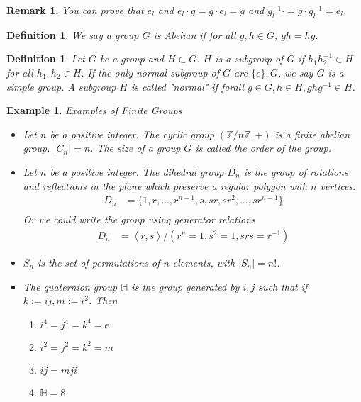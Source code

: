 \documentclass[letterpaper, leqno, 12pt]{article}
\newcommand{\fin}{\qquad \quad \hfill \framebox[1.75mm][l]{\,}}
\newcommand{\bZ}{\mathbb{Z}}
\providecommand{\abs}[1]{\left\lvert#1\right\rvert}
\providecommand{\ip}[1]{\left\langle #1 \right\rangle}
\theoremstyle{stdthm}
\theoremstyle{stddef}
\newtheorem{defn}[thm]{Definition}
\newtheorem{rem}[thm]{Remark} %
\newtheorem{eg}[thm]{Example} %
\theoremstyle{stdnonum}
\theoremstyle{stdqands}
\theoremstyle{stdbold}
\begin{document}
\begin{rem}
You can prove that $e_l$ and $e_l \cdot g = g \cdot e_l = g$ and $g_l^{-1} \cdot = g \cdot g_l^{-1} = e_l$. 
\end{rem}

\begin{defn}
We say a group $G$ is Abelian if for all $g,h\in G$, $gh = hg$. 
\end{defn}

\begin{defn}
Let $G$ be a group and $H\subset G$. $H$ is a subgroup of $G$ if $h_1 h_2^{-1} \in H$ for all $h_1,h_2 \in H$. If the only normal subgroup of $G$ are $\{e\},G$, we say $G$ is a simple group. A subgroup $H$ is called "normal" if forall $g\in G, h\in H, ghg^{-1} \in H$.   
\end{defn}

\begin{eg} Examples of Finite Groups
\begin{itemize}
\item Let $n$ be a positive integer. The cyclic group $(\bZ/n\bZ, +)$  is a finite abelian group. $|C_n| = n$. The size of a group $G$ is called the order of the group. 
\item Let $n$ be a positive integer. The dihedral group $D_n$ is the group of rotations and reflections in the plane which preserve a regular polygon with $n$ vertices. 
\begin{align*}
D_n &= \{1,r,\dots,r^{n-1}, s,sr,sr^2,\dots,sr^{n-1}\}\\
\end{align*}
Or we could write the group using generator relations
\begin{align*}
D_n &= \ip{r,s}/(r^n=1,s^2 =1, srs = r^{-1})
\end{align*}

\item $S_n$ is the set of permutations of $n$ elements, with $\abs{S_n} = n!$. 

\item The quaternion group $\mathbb{H}$ is the group generated by $i,j$ such that if $k:= ij, m:= i^2$. Then
\begin{enumerate}
\item $i^4 = j^4 = k^4 = e$
\item $i^2 = j^2 = k^2 = m$
\item $ij = mji$ 
\item $\mathbb{H} = 8 $

\end{enumerate}
\end{itemize}
\end{eg}
\end{document}
